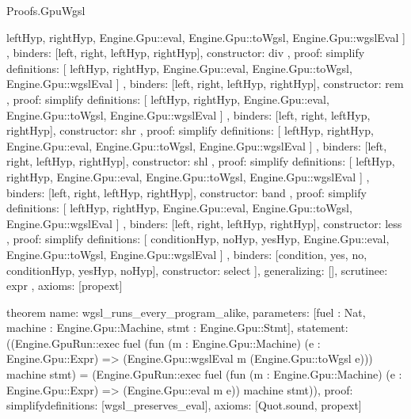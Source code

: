 \begin{lexlean}{Proofs.GpuWgsl}
\begin{semanticmodule}
{{{{            leftHyp,
            rightHyp,
            Engine.Gpu::eval,
            Engine.Gpu::toWgsl,
            Engine.Gpu::wgslEval
          ]
        },
        binders: [left, right, leftHyp, rightHyp],
        constructor: div
      },
      {
        proof: simplify{
          definitions: [
            leftHyp,
            rightHyp,
            Engine.Gpu::eval,
            Engine.Gpu::toWgsl,
            Engine.Gpu::wgslEval
          ]
        },
        binders: [left, right, leftHyp, rightHyp],
        constructor: rem
      },
      {
        proof: simplify{
          definitions: [
            leftHyp,
            rightHyp,
            Engine.Gpu::eval,
            Engine.Gpu::toWgsl,
            Engine.Gpu::wgslEval
          ]
        },
        binders: [left, right, leftHyp, rightHyp],
        constructor: shr
      },
      {
        proof: simplify{
          definitions: [
            leftHyp,
            rightHyp,
            Engine.Gpu::eval,
            Engine.Gpu::toWgsl,
            Engine.Gpu::wgslEval
          ]
        },
        binders: [left, right, leftHyp, rightHyp],
        constructor: shl
      },
      {
        proof: simplify{
          definitions: [
            leftHyp,
            rightHyp,
            Engine.Gpu::eval,
            Engine.Gpu::toWgsl,
            Engine.Gpu::wgslEval
          ]
        },
        binders: [left, right, leftHyp, rightHyp],
        constructor: band
      },
      {
        proof: simplify{
          definitions: [
            leftHyp,
            rightHyp,
            Engine.Gpu::eval,
            Engine.Gpu::toWgsl,
            Engine.Gpu::wgslEval
          ]
        },
        binders: [left, right, leftHyp, rightHyp],
        constructor: less
      },
      {
        proof: simplify{
          definitions: [
            conditionHyp,
            noHyp,
            yesHyp,
            Engine.Gpu::eval,
            Engine.Gpu::toWgsl,
            Engine.Gpu::wgslEval
          ]
        },
        binders: [condition, yes, no, conditionHyp, yesHyp, noHyp],
        constructor: select
      }
    ],
    generalizing: [],
    scrutinee: expr
  },
  axioms: [propext]
}

theorem{
  name: wgsl_runs_every_program_alike,
  parameters: [fuel : Nat, machine : Engine.Gpu::Machine, stmt : Engine.Gpu::Stmt],
  statement: ((Engine.GpuRun::exec fuel (fun (m : Engine.Gpu::Machine) (e : Engine.Gpu::Expr) => (Engine.Gpu::wgslEval m (Engine.Gpu::toWgsl e))) machine stmt) = (Engine.GpuRun::exec fuel (fun (m : Engine.Gpu::Machine) (e : Engine.Gpu::Expr) => (Engine.Gpu::eval m e)) machine stmt)),
  proof: simplify{definitions: [wgsl_preserves_eval]},
  axioms: [Quot.sound, propext]
}
\end{semanticmodule}
\end{lexlean}
